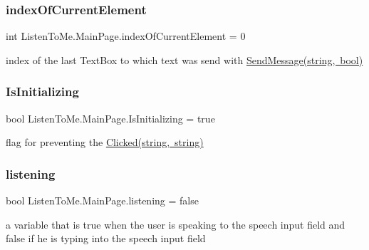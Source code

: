 \subsubsection{\texorpdfstring{index\+Of\+Current\+Element}{indexOfCurrentElement}}
{\footnotesize\ttfamily int Listen\+To\+Me.\+Main\+Page.\+index\+Of\+Current\+Element = 0\hspace{0.3cm}{\ttfamily [private]}}



index of the last Text\+Box to which text was send with \mbox{\hyperlink{class_listen_to_me_1_1_main_page_a09c2518852d4261ff6a2118c8e01de9f}{Send\+Message(string, bool)}} 

\mbox{\label{class_listen_to_me_1_1_main_page_a448f51804566fe32efca61994caf9ab9}} 
\subsubsection{\texorpdfstring{Is\+Initializing}{IsInitializing}}
{\footnotesize\ttfamily bool Listen\+To\+Me.\+Main\+Page.\+Is\+Initializing = true\hspace{0.3cm}{\ttfamily [private]}}



flag for preventing the \mbox{\hyperlink{class_listen_to_me_1_1_main_page_a465e7f9723aec19e912a3913841d477e}{Clicked(string, string)}} 

\mbox{\label{class_listen_to_me_1_1_main_page_ad46f69d6d70b9b13b74b4013b86ca608}} 
\subsubsection{\texorpdfstring{listening}{listening}}
{\footnotesize\ttfamily bool Listen\+To\+Me.\+Main\+Page.\+listening = false\hspace{0.3cm}{\ttfamily [private]}}



a variable that is true when the user is speaking to the speech input field and false if he is typing into the speech input field 

